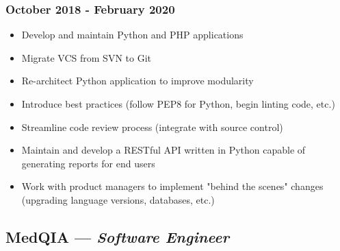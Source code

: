 \documentclass{article}
\begin{document}
\begin{minipage}[t]{.8\textwidth}
\subsubsection*{October 2018 - February 2020}
\parbox[t]{.5\textwidth}{\raggedright%
\begin{itemize}
\vspace{-0.5em}
	\item Develop and maintain Python and PHP applications
	\item Migrate VCS from SVN to Git
	\item Re-architect Python application to improve modularity
	\item Introduce best practices (follow PEP8 for Python, begin linting code, etc.)
\end{itemize}}
\parbox[t]{.5\textwidth}{\raggedright%
\begin{itemize}
\vspace{-1.5em}
	\item Streamline code review process (integrate with source control)
	\item Maintain and develop a RESTful API written in Python capable of generating reports for end users
	\item Work with product managers to implement "behind the scenes" changes (upgrading language versions, databases, etc.)
\end{itemize}}
\vspace{-1.5em}
\subsection*{MedQIA --- \textit{Software Engineer}}

\end{minipage}
\end{document}
